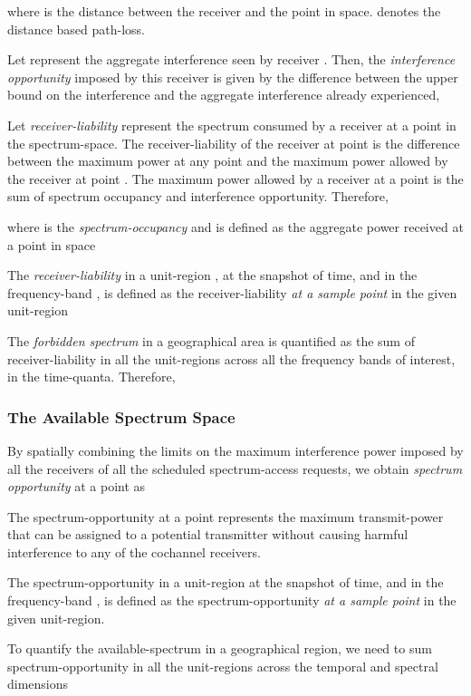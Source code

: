 \documentclass[12pt, draftclsnofoot, onecolumn]{IEEEtran}
\begin{document}
where  is the distance between the receiver  and the point  in space.  denotes the distance based path-loss.

Let  represent the aggregate interference seen by receiver . Then, the \textit{interference opportunity} imposed by this receiver is given by the difference between the upper bound on the interference and the aggregate interference already experienced,


Let \textit{receiver-liability} represent the spectrum consumed by a receiver at a point in the spectrum-space. The receiver-liability of the receiver  at point  is the difference between the maximum power at any point  and the maximum power allowed by the receiver  at point . The maximum power allowed by a receiver at a point is the sum of spectrum occupancy and interference opportunity. Therefore,

where  is the \textit{spectrum-occupancy} and is defined as the aggregate power received at a point  in space


The \textit{receiver-liability} in a unit-region , at the  snapshot of time, and in the frequency-band ,  is defined as the receiver-liability \textit{at a sample point}  in the given unit-region 


The \textit{forbidden spectrum} in a geographical area is quantified as the sum of receiver-liability in all the unit-regions across all the frequency bands of interest, in the  time-quanta. Therefore, 


\subsubsection{The Available Spectrum Space}

By spatially combining the limits on the maximum interference power imposed by all the receivers of all the scheduled spectrum-access requests, we obtain \textit{spectrum opportunity} at a point  as


The spectrum-opportunity at a point represents the maximum transmit-power that can be assigned to a potential transmitter without causing harmful interference to any of the cochannel receivers.

The spectrum-opportunity in a unit-region  at the  snapshot of time, and in the frequency-band , is defined as the spectrum-opportunity \textit{at a sample point}  in the given unit-region. 

To quantify the available-spectrum in a geographical region, we need to sum spectrum-opportunity in all the unit-regions across the temporal and spectral dimensions
\end{document}
